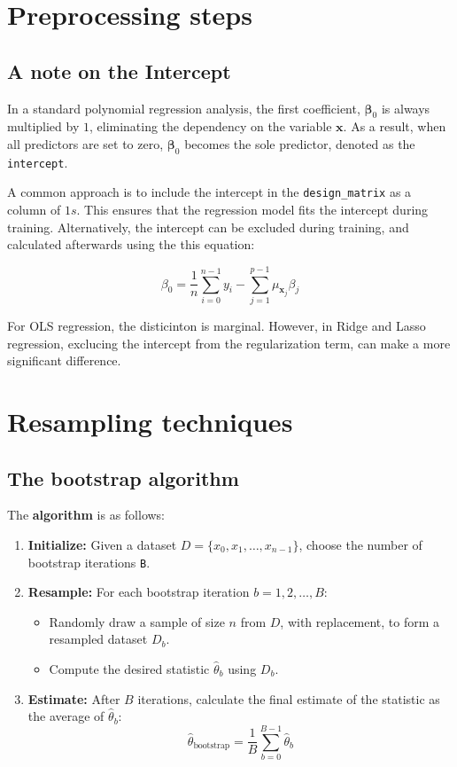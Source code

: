 \documentclass{article}
\begin{document}
\section{Preprocessing steps}
\label{app:dataset}
\subsection{A note on the Intercept}
\label{app_prep:intercept}
In a standard polynomial regression analysis, the first coefficient, $\bm{\beta}_0$ is always multiplied by $1$, eliminating the dependency on the variable $\bm{x}$. As a result, when all predictors are set to zero, $\bm{\beta}_0$ becomes the sole predictor, denoted as the \texttt{intercept}.

A common approach is to include the intercept in the \texttt{design\_matrix} as a column of $1s$. This ensures that the regression model fits the intercept during training. Alternatively, the intercept can be excluded during training, and calculated afterwards using the this equation:

$$\beta_0 = \frac{1}{n}\sum_{i=0}^{n-1}y_i - \sum_{j=1}^{p-1} \mu_{\boldsymbol{x}_j}\beta_j$$

For OLS regression, the disticinton is marginal. However, in Ridge and Lasso regression, exclucing the intercept from the regularization term, can make a more significant difference.

\section{Resampling techniques}
\label{app:resampling}
\subsection{The bootstrap algorithm}
\label{app_resamp:bootstrap}
The \textbf{algorithm} is as follows:

\begin{enumerate}
    \item \textbf{Initialize:} Given a dataset $D = \{x_0, x_1, \ldots, x_{n-1}\}$, choose the number of bootstrap iterations \texttt{B}.
    \item \textbf{Resample:} For each bootstrap iteration $b = 1, 2, \dots, B$:
    \begin{itemize}
        \item Randomly draw a sample of size $n$ from $D$, with replacement, to form a resampled dataset $D_b$.
        \item Compute the desired statistic $\hat{\theta}_b$ using $D_b$.
    \end{itemize}
    \item \textbf{Estimate:} After $B$ iterations, calculate the final estimate of the statistic as the average of $\hat{\theta}_b$:
    \[
    \hat{\theta}_{\text{bootstrap}} = \frac{1}{B} \sum_{b=0}^{B-1} \hat{\theta}_b
    \]
\end{enumerate}
\end{document}

